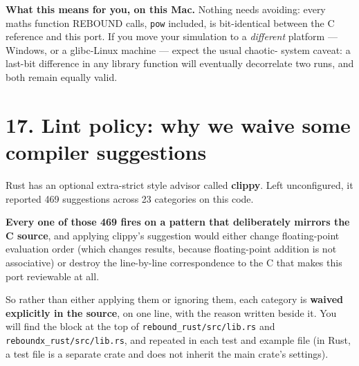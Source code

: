 \documentclass[11pt]{article}
\begin{document}
\textbf{What this means for you, on this Mac.} Nothing needs avoiding: every maths function REBOUND calls, \texttt{pow} included, is bit-identical between the C reference and this port. If you move your simulation to a \emph{different} platform --- Windows, or a glibc-Linux machine --- expect the usual chaotic- system caveat: a last-bit difference in any library function will eventually decorrelate two runs, and both remain equally valid.

\section{17. Lint policy: why we waive some compiler suggestions}

Rust has an optional extra-strict style advisor called \textbf{clippy}. Left unconfigured, it reported 469 suggestions across 23 categories on this code.

\textbf{Every one of those 469 fires on a pattern that deliberately mirrors the C source}, and applying clippy's suggestion would either change floating-point evaluation order (which changes results, because floating-point addition is not associative) or destroy the line-by-line correspondence to the C that makes this port reviewable at all.

So rather than either applying them or ignoring them, each category is \textbf{waived explicitly in the source}, on one line, with the reason written beside it. You will find the block at the top of \texttt{rebound\_rust/src/lib.rs} and \texttt{reboundx\_rust/src/lib.rs}, and repeated in each test and example file (in Rust, a test file is a separate crate and does not inherit the main crate's settings).
\end{document}

